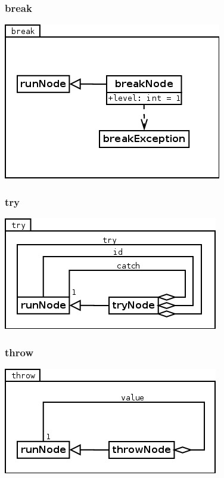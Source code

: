 \subsubsection{break}
\begin{center}
\includegraphics[scale=0.4]{break.png} \\
\end{center}

\subsubsection{try}
\begin{center}
\includegraphics[scale=0.4]{try.png} \\
\end{center}

\subsubsection{throw}
\begin{center}
\includegraphics[scale=0.4]{throw.png} \\
\end{center}


